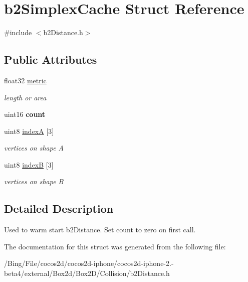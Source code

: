 \hypertarget{structb2_simplex_cache}{\section{b2\-Simplex\-Cache Struct Reference}
\label{structb2_simplex_cache}
}


{\ttfamily \#include $<$b2\-Distance.\-h$>$}

\subsection*{Public Attributes}
\begin{DoxyCompactItemize}
\item 
\hypertarget{structb2_simplex_cache_a018e0a500b417d79bfed3f21310b15a2}{float32 \hyperlink{structb2_simplex_cache_a018e0a500b417d79bfed3f21310b15a2}{metric}}\label{structb2_simplex_cache_a018e0a500b417d79bfed3f21310b15a2}

\begin{DoxyCompactList}\small\item\em length or area \end{DoxyCompactList}\item 
\hypertarget{structb2_simplex_cache_a5ef63839988cc06210ae76bcef96f56c}{uint16 {\bfseries count}}\label{structb2_simplex_cache_a5ef63839988cc06210ae76bcef96f56c}

\item 
\hypertarget{structb2_simplex_cache_ab574159e69dda7e14ead8de848ca6b67}{uint8 \hyperlink{structb2_simplex_cache_ab574159e69dda7e14ead8de848ca6b67}{index\-A} \mbox{[}3\mbox{]}}\label{structb2_simplex_cache_ab574159e69dda7e14ead8de848ca6b67}

\begin{DoxyCompactList}\small\item\em vertices on shape A \end{DoxyCompactList}\item 
\hypertarget{structb2_simplex_cache_ab7586465ee2c5f7c3bdd8f80d5e256a7}{uint8 \hyperlink{structb2_simplex_cache_ab7586465ee2c5f7c3bdd8f80d5e256a7}{index\-B} \mbox{[}3\mbox{]}}\label{structb2_simplex_cache_ab7586465ee2c5f7c3bdd8f80d5e256a7}

\begin{DoxyCompactList}\small\item\em vertices on shape B \end{DoxyCompactList}\end{DoxyCompactItemize}


\subsection{Detailed Description}
Used to warm start b2\-Distance. Set count to zero on first call. 

The documentation for this struct was generated from the following file\-:\begin{DoxyCompactItemize}
\item 
/\-Bing/\-File/cocos2d/cocos2d-\/iphone/cocos2d-\/iphone-\/2.-\/beta4/external/\-Box2d/\-Box2\-D/\-Collision/b2\-Distance.\-h\end{DoxyCompactItemize}
